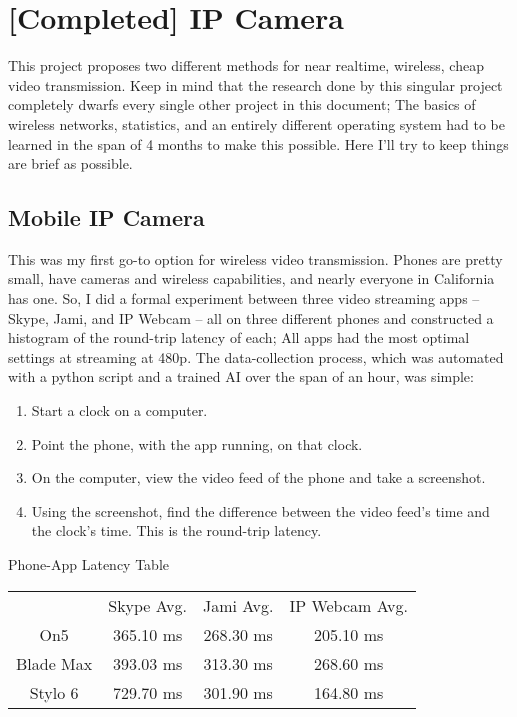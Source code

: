\section{[Completed] IP Camera}

This project proposes two different methods for near realtime, wireless, cheap video transmission. Keep in mind that the research done by this singular project completely dwarfs every single other project in this document; The basics of wireless networks, statistics, and an entirely different operating system had to be learned in the span of 4 months to make this possible. Here I'll try to keep things are brief as possible.

\subsection{Mobile IP Camera}

This was my first go-to option for wireless video transmission. Phones are pretty small, have cameras and wireless capabilities, and nearly everyone in California has one. So, I did a formal experiment between three video streaming apps -- Skype, Jami, and IP Webcam -- all on three different phones and constructed a histogram of the round-trip latency of each; All apps had the most optimal settings at streaming at 480p. The data-collection process, which was automated with a python script and a trained AI over the span of an hour, was simple:

\begin{enumerate}
\item{Start a clock on a computer.}
\item{Point the phone, with the app running, on that clock.}
\item{On the computer, view the video feed of the phone and take a screenshot.}
\item{Using the screenshot, find the difference between the video feed's time and the clock's time. This is the round-trip latency. }
\end{enumerate}

\begin{centering}
Phone-App Latency Table\\[0.5cm]

\begin{tabular}{c|c|c|c}
    & Skype Avg. & Jami Avg. & IP Webcam Avg. \\[0.5cm]
    On5 & 365.10 ms & 268.30 ms & 205.10 ms \\[0.5cm]
    Blade Max & 393.03 ms & 313.30 ms & 268.60 ms \\[0.5cm]
    Stylo 6 & 729.70 ms & 301.90 ms & 164.80 ms
\end{tabular} \newline

\end{centering}


